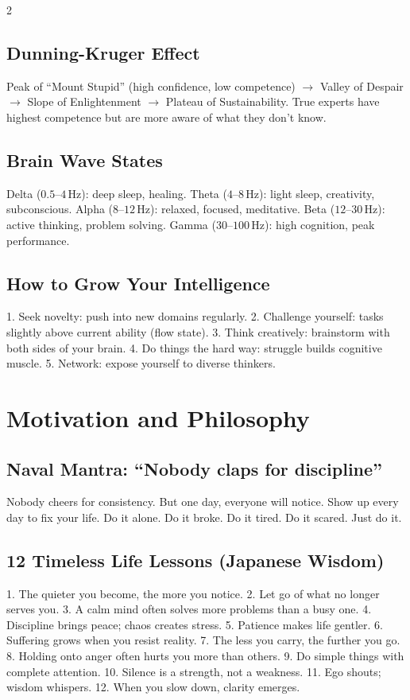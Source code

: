 \documentclass[10pt,a4paper]{article}
\begin{document}
\begin{multicols}{2}
\subsection{Dunning-Kruger Effect}
Peak of ``Mount Stupid'' (high confidence, low competence) $\to$ Valley of Despair $\to$ Slope of Enlightenment $\to$ Plateau of Sustainability. True experts have highest competence but are more aware of what they don't know.

\subsection{Brain Wave States}
Delta ($0.5$--$4$\,Hz): deep sleep, healing. Theta ($4$--$8$\,Hz): light sleep, creativity, subconscious. Alpha ($8$--$12$\,Hz): relaxed, focused, meditative. Beta ($12$--$30$\,Hz): active thinking, problem solving. Gamma ($30$--$100$\,Hz): high cognition, peak performance.

\subsection{How to Grow Your Intelligence}
1. Seek novelty: push into new domains regularly. 2. Challenge yourself: tasks slightly above current ability (flow state). 3. Think creatively: brainstorm with both sides of your brain. 4. Do things the hard way: struggle builds cognitive muscle. 5. Network: expose yourself to diverse thinkers.

\section{Motivation and Philosophy}

\subsection{Naval Mantra: ``Nobody claps for discipline''}
Nobody cheers for consistency. But one day, everyone will notice. Show up every day to fix your life. Do it alone. Do it broke. Do it tired. Do it scared. Just do it.

\subsection{12 Timeless Life Lessons (Japanese Wisdom)}
1. The quieter you become, the more you notice. 2. Let go of what no longer serves you. 3. A calm mind often solves more problems than a busy one. 4. Discipline brings peace; chaos creates stress. 5. Patience makes life gentler. 6. Suffering grows when you resist reality. 7. The less you carry, the further you go. 8. Holding onto anger often hurts you more than others. 9. Do simple things with complete attention. 10. Silence is a strength, not a weakness. 11. Ego shouts; wisdom whispers. 12. When you slow down, clarity emerges.


\end{multicols}
\end{document}
